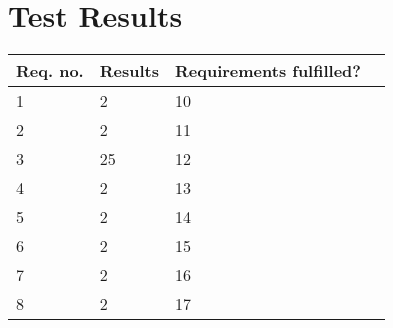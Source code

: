 \section{Test Results}\label{cha:TestProcedure}

\begin{table}[H] \centering
\begin{tabular}{|p{2cm}|p{5cm}|p{6cm}|p{3cm}|}
\hline%
\textbf{Req. no.}  &  \textbf{Results} &  \textbf{Requirements fulfilled?}         \\
\hline%
           1    &   2   &   10                \\
\hline%
           2    &   2  &  11               \\
\hline%
           3    &   25   &  12           \\
\hline%
           4    &   2   &   13                  \\
\hline%
           5    &   2 &   14               \\
\hline%
           6    &   2  &    15                \\
\hline%
           7    &   2   &   16            \\ 
\hline%
           8    &   2  &    17             \\
\hline%
\end{tabular}
\label{tab:AcceptTestTestResults}
\end{table}

